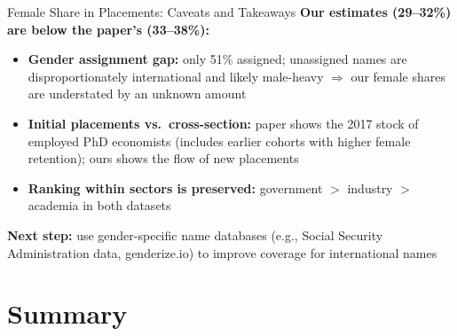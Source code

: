 \documentclass[aspectratio=169]{beamer}
\begin{document}
\begin{frame}{Female Share in Placements: Caveats and Takeaways}
  \textbf{Our estimates (29--32\%) are below the paper's (33--38\%):}
  \vspace{0.3em}
  \begin{itemize}
    \item \textbf{Gender assignment gap:} only 51\% assigned; unassigned names
          are disproportionately international and likely male-heavy
          $\Rightarrow$ our female shares are understated by an unknown amount
    \item \textbf{Initial placements vs.\ cross-section:} paper shows the 2017
          stock of employed PhD economists (includes earlier cohorts with higher female
          retention); ours shows the flow of new placements
    \item \textbf{Ranking within sectors is preserved:}
          government $>$ industry $>$ academia in both datasets
  \end{itemize}
  \vspace{0.3em}
  \textbf{Next step:} use gender-specific name databases (e.g., Social Security
  Administration data, genderize.io) to improve coverage for international names
\end{frame}

\section{Summary}
\end{document}

